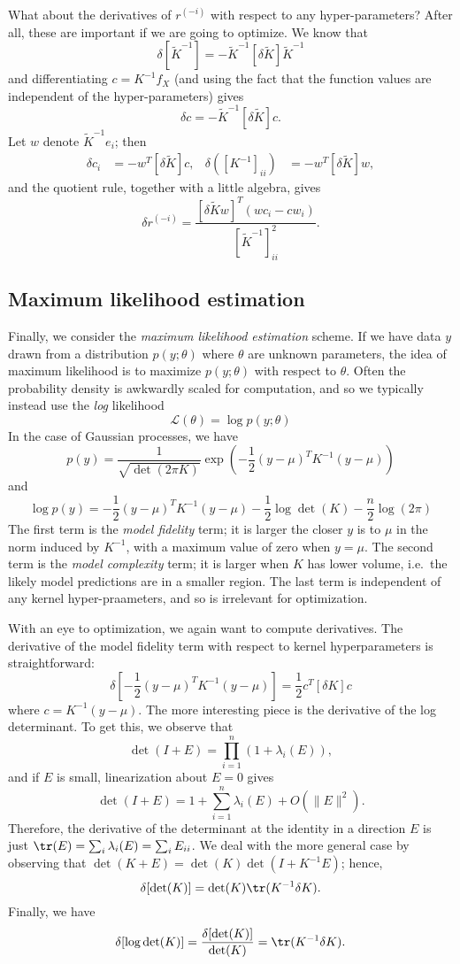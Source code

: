 \documentclass[12pt, leqno]{article} %
\begin{document}
What about the derivatives of $r^{(-i)}$ with respect to any
hyper-parameters?  After all, these are important if we are going to
optimize.  We know that
\[
  \delta[\tilde{K}^{-1}] = -\tilde{K}^{-1} [\delta \tilde{K}] \tilde{K}^{-1}
\]
and differentiating $c = K^{-1} f_X$ (and using the fact that the
function values are independent of the hyper-parameters) gives
\[
  \delta c = -\tilde{K}^{-1} [\delta \tilde{K}] c.
\]
Let $w$ denote $\tilde{K}^{-1} e_i$; then
\begin{align*}
  \delta c_i &= -w^T [\delta \tilde{K}] c, &
  \delta\left( [K^{-1}]_{ii} \right) &= -w^T [\delta \tilde{K}] w,
\end{align*}
and the quotient rule, together with a little algebra, gives
\[
\delta r^{(-i)} = \frac{[\delta \tilde{K} w]^T (wc_i-cw_i)}
                      {[\tilde{K}^{-1}]_{ii}^2}.
\]

\subsection{Maximum likelihood estimation}

Finally, we consider the {\em maximum likelihood estimation} scheme.
If we have data $y$ drawn from a distribution
$p(y ; \theta)$ where $\theta$ are unknown parameters, the idea of
maximum likelihood is to maximize $p(y; \theta)$ with respect to $\theta$.
Often the probability density is awkwardly scaled for computation,
and so we typically instead use the {\em log} likelihood
\[
  \mathcal{L}(\theta) =  \log p(y; \theta)
\]
In the case of Gaussian processes, we have
\[
p(y) = \frac{1}{\sqrt{\det(2\pi K)}}
       \exp\left( -\frac{1}{2} (y-\mu)^T K^{-1} (y-\mu) \right)
\]
and
\[
\log p(y) = -\frac{1}{2} (y-\mu)^T K^{-1} (y-\mu)
            -\frac{1}{2} \log \det(K) - \frac{n}{2} \log(2\pi)
\]
The first term is the {\em model fidelity} term; it is larger the closer
$y$ is to $\mu$ in the norm induced by $K^{-1}$, with a maximum value
of zero when $y=\mu$.  The second term is the {\em model complexity}
term; it is larger when $K$ has lower volume, i.e.~the likely model
predictions are in a smaller region.  The last term is independent
of any kernel hyper-praameters, and so is irrelevant for optimization.

With an eye to optimization, we again want to compute derivatives.
The derivative of the model fidelity term with respect to kernel
hyperparameters is straightforward:
\[
  \delta\left[ -\frac{1}{2} (y-\mu)^T K^{-1} (y-\mu) \right] =
  \frac{1}{2} c^T [\delta K] c
\]
where $c = K^{-1}(y-\mu)$.  The more interesting piece is the
derivative of the log determinant.  To get this, we observe that
\[
  \det(I+E) = \prod_{i=1}^n (1+\lambda_i(E)),
\]
and if $E$ is small, linearization about $E = 0$ gives
\[
  \det(I+E) = 1 + \sum_{i=1}^n \lambda_i(E) + O(\|E\|^2).
\]
Therefore, the derivative of the determinant at the identity
in a direction $E$ is just $\tr(E) = \sum_i \lambda_i(E) = \sum_i E_{ii}$.
We deal with the more general case by observing that
$\det(K+E) = \det(K) \det(I+K^{-1} E)$; hence,
\[
  \delta [\det(K)] = \det(K) \tr(K^{-1} \delta K).
\]
Finally, we have
\[
  \delta[\log \det(K)] = \frac{\delta[\det(K)]}{\det(K)}
    = \tr(K^{-1} \delta K).
\]
\end{document}
